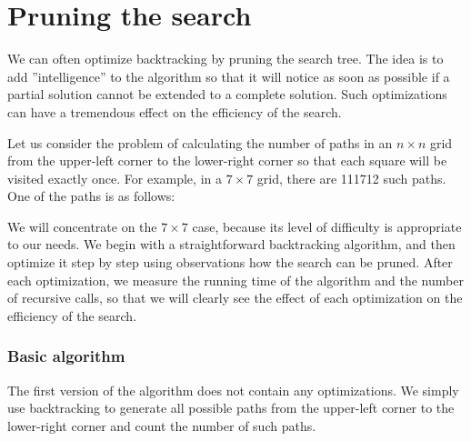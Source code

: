 \section{Pruning the search}

We can often optimize backtracking
by pruning the search tree.
The idea is to add ''intelligence'' to the algorithm
so that it will notice as soon as possible
if a partial solution cannot be extended
to a complete solution.
Such optimizations can have a tremendous
effect on the efficiency of the search.

Let us consider the problem
of calculating the number of paths
in an $n \times n$ grid from the upper-left corner
to the lower-right corner so that each square
will be visited exactly once.
For example, in a $7 \times 7$ grid,
there are 111712 such paths.
One of the paths is as follows:

\begin{center}
\end{center}

We will concentrate on the $7 \times 7$ case,
because its level of difficulty is appropriate to our needs.
We begin with a straightforward backtracking algorithm,
and then optimize it step by step using observations
how the search can be pruned.
After each optimization, we measure the running time
of the algorithm and the number of recursive calls,
so that we will clearly see the effect of each
optimization on the efficiency of the search.

\subsubsection{Basic algorithm}

The first version of the algorithm does not contain
any optimizations. We simply use backtracking to generate
all possible paths from the upper-left corner to
the lower-right corner and count the number of such paths.

